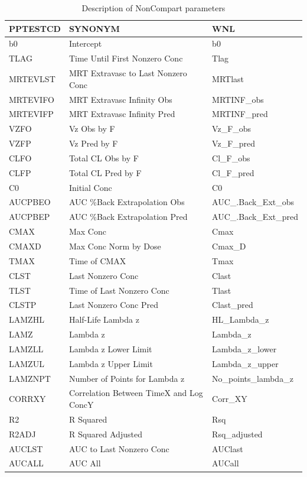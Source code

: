 \documentclass[12pt,]{krantz}
\begin{document}
\begin{longtable}[t]{lll}
\caption{\label{tab:rptcfg}Description of NonCompart parameters}\\
\toprule
PPTESTCD & SYNONYM & WNL\\
\midrule
b0 & Intercept & b0\\
TLAG & Time Until First Nonzero Conc & Tlag\\
MRTEVLST & MRT Extravasc to Last Nonzero Conc & MRTlast\\
MRTEVIFO & MRT Extravasc Infinity Obs & MRTINF\_obs\\
MRTEVIFP & MRT Extravasc Infinity Pred & MRTINF\_pred\\
\addlinespace
VZFO & Vz Obs by F & Vz\_F\_obs\\
VZFP & Vz Pred by F & Vz\_F\_pred\\
CLFO & Total CL Obs by F & Cl\_F\_obs\\
CLFP & Total CL Pred by F & Cl\_F\_pred\\
C0 & Initial Conc & C0\\
\addlinespace
AUCPBEO & AUC \%Back Extrapolation Obs & AUC\_.Back\_Ext\_obs\\
AUCPBEP & AUC \%Back Extrapolation Pred & AUC\_.Back\_Ext\_pred\\
CMAX & Max Conc & Cmax\\
CMAXD & Max Conc Norm by Dose & Cmax\_D\\
TMAX & Time of CMAX & Tmax\\
\addlinespace
CLST & Last Nonzero Conc & Clast\\
TLST & Time of Last Nonzero Conc & Tlast\\
CLSTP & Last Nonzero Conc Pred & Clast\_pred\\
LAMZHL & Half-Life Lambda z & HL\_Lambda\_z\\
LAMZ & Lambda z & Lambda\_z\\
\addlinespace
LAMZLL & Lambda z Lower Limit & Lambda\_z\_lower\\
LAMZUL & Lambda z Upper Limit & Lambda\_z\_upper\\
LAMZNPT & Number of Points for Lambda z & No\_points\_lambda\_z\\
CORRXY & Correlation Between TimeX and Log ConcY & Corr\_XY\\
R2 & R Squared & Rsq\\
\addlinespace
R2ADJ & R Squared Adjusted & Rsq\_adjusted\\
AUCLST & AUC to Last Nonzero Conc & AUClast\\
AUCALL & AUC All & AUCall\\

\end{longtable}
\end{document}
